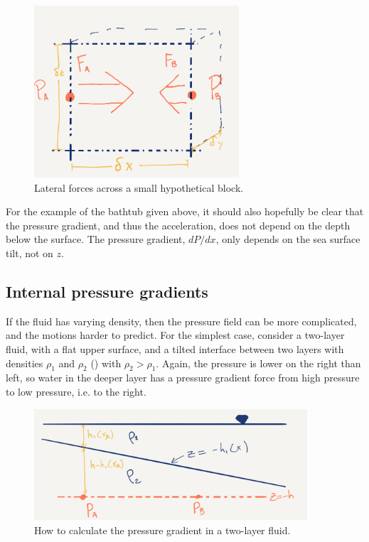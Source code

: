 \begin{figure}[htbp]
    \includegraphics[width=3in]{figs/ForceDia.png}
    \caption{Lateral forces across a small hypothetical block.}
    \label{fig:ForceDia}
\end{figure}


For the example of the bathtub given above, it should also hopefully be clear that the pressure gradient, and thus the acceleration, does not depend on the depth below the surface.  The pressure gradient, $dP/dx$, only depends on the sea surface tilt, not on $z$.

\subsection{Internal pressure gradients}

If the fluid has varying density, then the pressure field can be more complicated, and the motions harder to predict.  For the simplest case, consider a two-layer fluid, with a flat upper surface, and a tilted interface between two layers with densities $\rho_{1}$ and $\rho_{2}$ () with $\rho_{2}>\rho_{1}$.  Again, the pressure is lower on the right than left, so water in the deeper layer has a pressure gradient force from high pressure to low pressure, i.e. to the right.
\begin{figure}[htbp]
\begin{center}
\includegraphics[width=4in]{figs/TwoLayer.png}
\caption{How to calculate the pressure gradient in a two-layer fluid.}
\label{fig:TwoLayer}
\end{center}
\end{figure}


